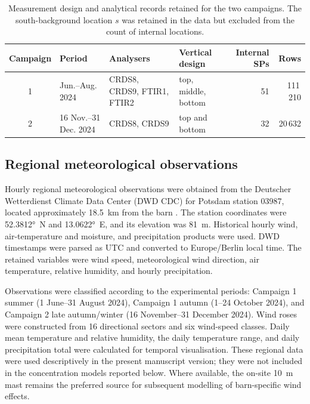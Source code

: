 \documentclass[12pt,a4paper]{article}
\begin{document}
\begin{table}[htbp]
\centering
\caption{Measurement design and analytical records retained for the two
campaigns. The south-background location \(s\) was retained in the data but
excluded from the count of internal locations.}
\label{tab:campaigns}
\begingroup
\small
\setlength{\tabcolsep}{1.5pt}
\begin{tabular}{@{}c l
  >{\raggedright\arraybackslash}p{4.0cm}
  >{\raggedright\arraybackslash}p{2.7cm}
  r r@{}}
\toprule
Campaign & Period & Analysers & Vertical design & Internal SPs & Rows\\
\midrule
1 & Jun.--Aug. 2024 & CRDS8, CRDS9, FTIR1, FTIR2 &
top, middle, bottom & 51 & 111\,210\\
2 & 16 Nov.--31 Dec. 2024 & CRDS8, CRDS9 &
top and bottom & 32 & 20\,632\\
\bottomrule
\end{tabular}
\endgroup
\end{table}

\subsection{Regional meteorological observations}

Hourly regional meteorological observations were obtained from the Deutscher
Wetterdienst Climate Data Center (DWD CDC) for Potsdam station 03987, located
approximately \SI{18.5}{km} from the barn \citep{DWD2024}. The station
coordinates were \ang{52.3812}~N and \ang{13.0622}~E, and its elevation was
\SI{81}{m}. Historical hourly
wind, air-temperature and moisture, and precipitation products were used.
DWD timestamps were parsed as UTC and converted to Europe/Berlin local time.
The retained variables were wind speed, meteorological wind direction, air
temperature, relative humidity, and hourly precipitation.

Observations were classified according to the experimental periods: Campaign
1 summer (1 June--31 August 2024), Campaign 1 autumn (1--24 October 2024), and
Campaign 2 late autumn/winter (16 November--31 December 2024). Wind roses were
constructed from 16 directional sectors and six wind-speed classes. Daily mean
temperature and relative humidity, the daily temperature range, and daily
precipitation total were calculated for temporal visualisation. These regional
data were used descriptively in the present manuscript version; they were not
included in the concentration models reported below. Where available, the
on-site \SI{10}{m} mast remains the preferred source for subsequent modelling
of barn-specific wind effects.
\end{document}
